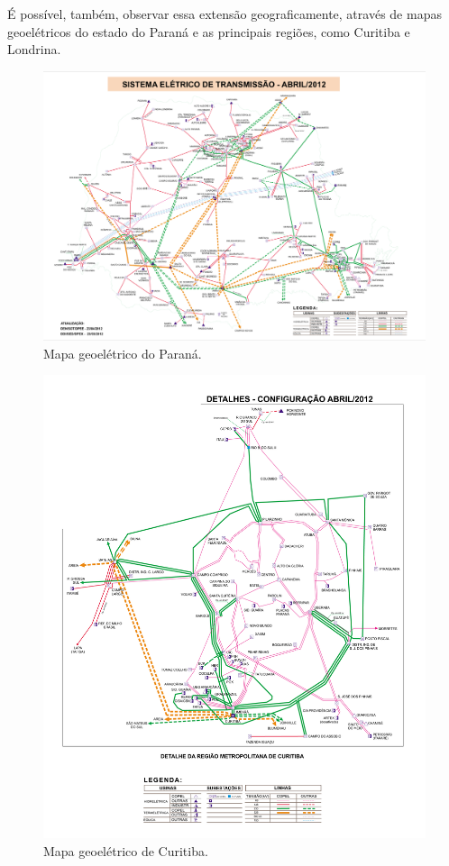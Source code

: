 \documentclass[grad,numbers]{coppe}
\begin{document}
  É possível, também, observar essa extensão geograficamente, através de mapas geoelétricos do estado do Paraná e as principais regiões, como Curitiba e Londrina.
  \begin{figure}[H]
  \includegraphics[width=1\linewidth]{img/mapa_geoeletrico_parana} \caption{Mapa geoelétrico do Paraná.}\label{fig:unnamed-chunk-4}
  \end{figure}
  \begin{figure}[H]
  \includegraphics[width=1\linewidth]{img/mapa_geoeletrico_curitiba} \caption{Mapa geoelétrico de Curitiba.}\label{fig:unnamed-chunk-5}
  \end{figure}
\end{document}
